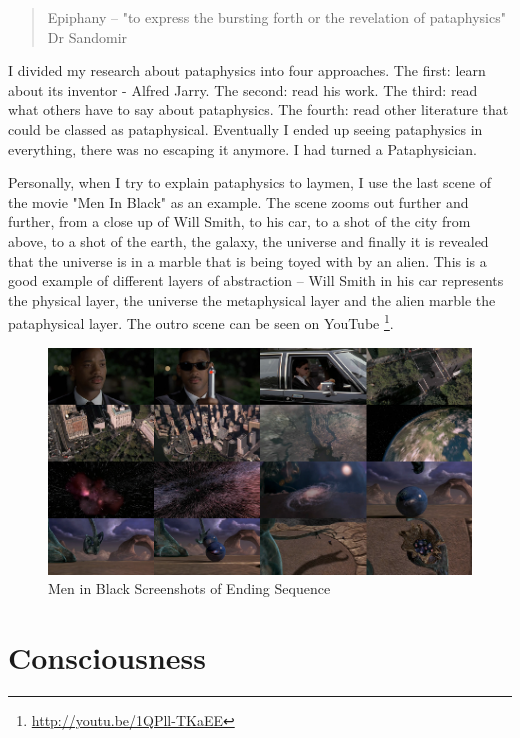 \begin{quote}
  Epiphany – "to express the bursting forth or the revelation of pataphysics" Dr Sandomir \citep[p.174]{Hugill2012a}
\end{quote}

I divided my research about pataphysics into four approaches. The first: learn about its inventor - Alfred Jarry. The second: read his work. The third: read what others have to say about pataphysics. The fourth: read other literature that could be classed as pataphysical. Eventually I ended up seeing pataphysics in everything, there was no escaping it anymore. I had turned a Pataphysician.

Personally, when I try to explain pataphysics to laymen, I use the last scene of the movie "Men In Black" as an example. The scene zooms out further and further, from a close up of Will Smith, to his car, to a shot of the city from above, to a shot of the earth, the galaxy, the universe and finally it is revealed that the universe is in a marble that is being toyed with by an alien. This is a good example of different layers of abstraction – Will Smith in his car represents the physical layer, the universe the metaphysical layer and the alien marble the pataphysical layer. The outro scene can be seen on YouTube \footnote{\url{http://youtu.be/1QPll-TKaEE}}.

\begin{figure}[htb] %
  \centering
  \includegraphics[width=\linewidth]{images/mib}
  \caption[Men in Black]{Men in Black Screenshots of Ending Sequence}
  \label{fig:MIB}
\end{figure}

\section{Consciousness}

